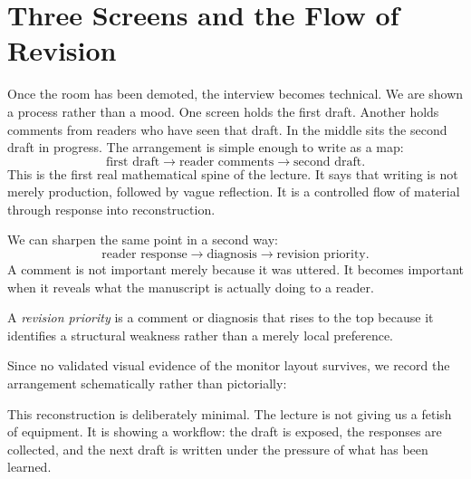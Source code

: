 \section{Three Screens and the Flow of Revision}

Once the room has been demoted, the interview becomes technical. We are shown a process rather than a mood. One screen holds the first draft. Another holds comments from readers who have seen that draft. In the middle sits the second draft in progress. The arrangement is simple enough to write as a map:
\begin{equation}
\text{first draft} \to \text{reader comments} \to \text{second draft}.
\end{equation}
This is the first real mathematical spine of the lecture. It says that writing is not merely production, followed by vague reflection. It is a controlled flow of material through response into reconstruction.

We can sharpen the same point in a second way:
\begin{equation}
\text{reader response} \to \text{diagnosis} \to \text{revision priority}.
\end{equation}
A comment is not important merely because it was uttered. It becomes important when it reveals what the manuscript is actually doing to a reader.

\begin{definition}
A \emph{revision priority} is a comment or diagnosis that rises to the top because it identifies a structural weakness rather than a merely local preference.
\end{definition}

Since no validated visual evidence of the monitor layout survives, we record the arrangement schematically rather than pictorially:

\begin{figure}[h]
\centering
{}
\end{figure}

This reconstruction is deliberately minimal. The lecture is not giving us a fetish of equipment. It is showing a workflow: the draft is exposed, the responses are collected, and the next draft is written under the pressure of what has been learned.

